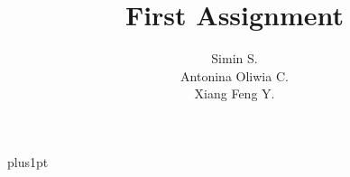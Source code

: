 \documentclass[12pt]{ociamthesis}
\title{First Assignment}
\author{Simin S. \\ Antonina Oliwia C. \\ Xiang Feng Y.}
\begin{document}
\baselineskip=18pt plus1pt

\setcounter{secnumdepth}{3}
\setcounter{tocdepth}{2}

\maketitle

\begin{romanpages}          %
\tableofcontents
\end{romanpages}            %





\startappendix


\clearpage

\end{document}
